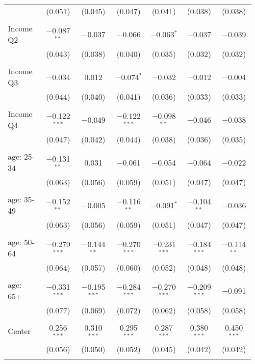 \begin{tabular}{@{\extracolsep{5pt}}lcccccc}
  & (0.051) & (0.045) & (0.047) & (0.041) & (0.038) & (0.038) \\ 
  & & & & & & \\ 
 Income Q2 & $-$0.087$^{**}$ & $-$0.037 & $-$0.066 & $-$0.063$^{*}$ & $-$0.037 & $-$0.039 \\ 
  & (0.043) & (0.038) & (0.040) & (0.035) & (0.032) & (0.032) \\ 
  & & & & & & \\ 
 Income Q3 & $-$0.034 & 0.012 & $-$0.074$^{*}$ & $-$0.032 & $-$0.012 & $-$0.004 \\ 
  & (0.044) & (0.040) & (0.041) & (0.036) & (0.033) & (0.033) \\ 
  & & & & & & \\ 
 Income Q4 & $-$0.122$^{***}$ & $-$0.049 & $-$0.122$^{***}$ & $-$0.098$^{**}$ & $-$0.046 & $-$0.038 \\ 
  & (0.047) & (0.042) & (0.044) & (0.038) & (0.036) & (0.035) \\ 
  & & & & & & \\ 
 age: 25-34 & $-$0.131$^{**}$ & 0.031 & $-$0.061 & $-$0.054 & $-$0.064 & $-$0.022 \\ 
  & (0.063) & (0.056) & (0.059) & (0.051) & (0.047) & (0.047) \\ 
  & & & & & & \\ 
 age: 35-49 & $-$0.152$^{**}$ & $-$0.005 & $-$0.116$^{**}$ & $-$0.091$^{*}$ & $-$0.104$^{**}$ & $-$0.036 \\ 
  & (0.063) & (0.056) & (0.059) & (0.051) & (0.047) & (0.047) \\ 
  & & & & & & \\ 
 age: 50-64 & $-$0.279$^{***}$ & $-$0.144$^{**}$ & $-$0.270$^{***}$ & $-$0.231$^{***}$ & $-$0.184$^{***}$ & $-$0.114$^{**}$ \\ 
  & (0.064) & (0.057) & (0.060) & (0.052) & (0.048) & (0.048) \\ 
  & & & & & & \\ 
 age: 65+ & $-$0.331$^{***}$ & $-$0.195$^{***}$ & $-$0.284$^{***}$ & $-$0.270$^{***}$ & $-$0.209$^{***}$ & $-$0.091 \\ 
  & (0.077) & (0.069) & (0.072) & (0.062) & (0.058) & (0.058) \\ 
  & & & & & & \\ 
 Center & 0.256$^{***}$ & 0.310$^{***}$ & 0.295$^{***}$ & 0.287$^{***}$ & 0.380$^{***}$ & 0.450$^{***}$ \\ 
  & (0.056) & (0.050) & (0.052) & (0.045) & (0.042) & (0.042) \\ 
  & & & & & & \\ 

\end{tabular}
